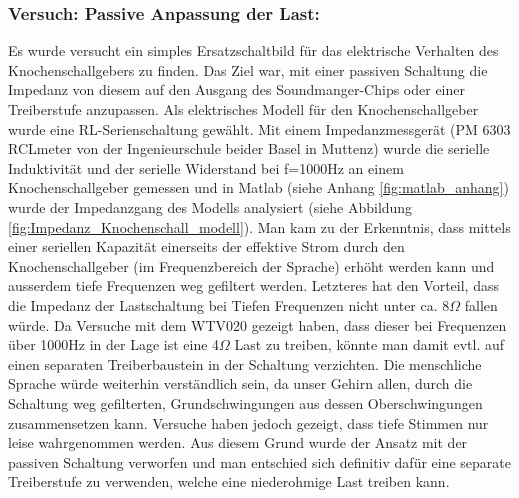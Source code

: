   \subsubsection{Versuch: Passive Anpassung der Last:}
  Es wurde versucht ein simples Ersatzschaltbild für das elektrische Verhalten des Knochenschallgebers zu finden. 
  Das Ziel war, mit einer passiven Schaltung die Impedanz von diesem auf den Ausgang des Soundmanger-Chips oder einer Treiberstufe anzupassen. 
  Als elektrisches Modell für den Knochenschallgeber wurde eine RL-Serienschaltung gewählt. 
  Mit einem Impedanzmessgerät (PM 6303 RCLmeter von der Ingenieurschule beider Basel in Muttenz) wurde die serielle Induktivität und der serielle Widerstand bei f=1000Hz an einem Knochenschallgeber gemessen und in Matlab (siehe Anhang \ref{fig:matlab_anhang}) wurde der Impedanzgang des Modells analysiert (siehe Abbildung \ref{fig:Impedanz_Knochenschall_modell}). 
  Man kam zu der Erkenntnis, dass mittels einer seriellen Kapazität einerseits der effektive Strom durch den Knochenschallgeber (im Frequenzbereich der Sprache) erhöht werden kann und ausserdem tiefe Frequenzen weg gefiltert werden. 
  Letzteres hat den Vorteil, dass die Impedanz der Lastschaltung bei Tiefen Frequenzen nicht unter ca. 8\(\Omega\) fallen würde. Da Versuche mit dem WTV020 gezeigt haben, dass dieser bei Frequenzen über 1000Hz in der Lage ist eine 4\(\Omega\) Last zu treiben,
   könnte man damit evtl. auf einen separaten Treiberbaustein in der Schaltung verzichten. 
  Die menschliche Sprache würde weiterhin verständlich sein, da unser Gehirn allen, durch die Schaltung weg gefilterten, Grundschwingungen aus dessen Oberschwingungen zusammensetzen kann. 
  Versuche haben jedoch gezeigt, dass tiefe Stimmen nur leise wahrgenommen werden. 
  Aus diesem Grund wurde der Ansatz mit der passiven Schaltung verworfen und man entschied sich definitiv dafür eine separate Treiberstufe zu verwenden, welche eine niederohmige Last treiben kann.
  
